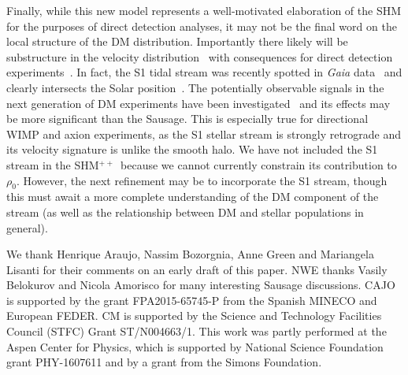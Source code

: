 \documentclass[prd,10pt,twocolumn,showpacs,nofootinbib, aps,superscriptaddress,preprintnumbers]{revtex4-1}
\newcommand{\SHMpp}{SHM$^{++}$}
\begin{document}
Finally, while this new model represents a well-motivated elaboration
of the SHM for the purposes of direct detection analyses, it may not
be the final word on the local structure of the DM
distribution. Importantly there likely will be substructure in the
velocity distribution~\cite{Vogelsberger:2010gd,Lisanti:2010qx} with
consequences for direct detection
experiments~\cite{Lee:2012pf,O'Hare:2014oxa,Savage:2006qr,Foster:2017hbq,OHare:2017yze,Kavanagh:2016xfi}. In
fact, the S1 tidal stream was recently spotted in \emph{Gaia}
data~\cite{Myeong:2017skt} and clearly intersects the Solar
position~\cite{Myeong:Preprint}.  The potentially observable signals
in the next generation of DM experiments have been
investigated~\cite{OHare:2018trr} and its effects may be more
significant than the Sausage. This is especially true for directional
WIMP and axion experiments, as the S1 stellar stream is strongly
retrograde and its velocity signature is unlike the smooth halo.  We
have not included the S1 stream in the \SHMpp~because we cannot
currently constrain its contribution to $\rho_0$.  However, the next
refinement may be to incorporate the S1 stream, though this must await
a more complete understanding of the DM component of the stream (as
well as the relationship between DM and stellar populations in
general).

\acknowledgments We thank Henrique Araujo, Nassim Bozorgnia, Anne
Green and Mariangela Lisanti for their comments on an early draft of
this paper. NWE thanks Vasily Belokurov and Nicola Amorisco for many
interesting Sausage discussions. CAJO is supported by the grant
FPA2015-65745-P from the Spanish MINECO and European FEDER.  CM is
supported by the Science and Technology Facilities Council (STFC)
Grant ST/N004663/1. This work was partly performed at the Aspen Center
for Physics, which is supported by National Science Foundation grant
PHY-1607611 and by a grant from the Simons Foundation.



\end{document}
